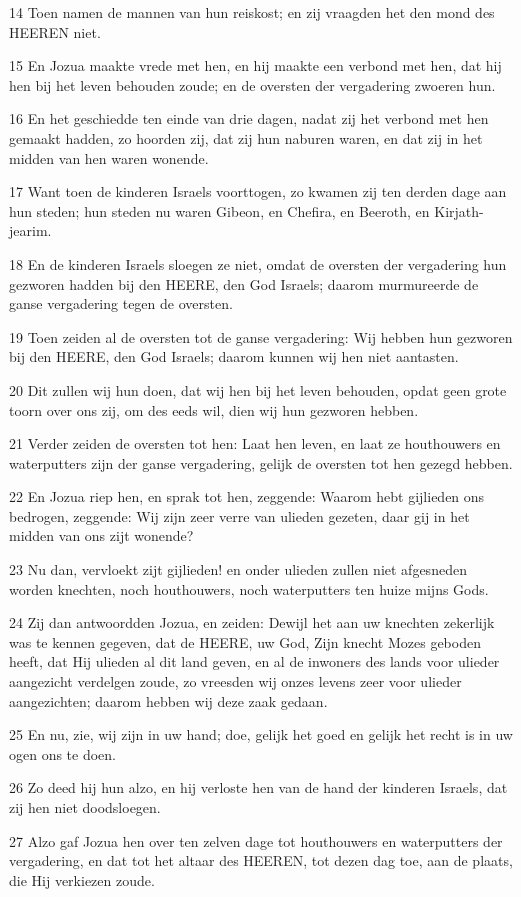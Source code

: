 \par 14 Toen namen de mannen van hun reiskost; en zij vraagden het den mond des HEEREN niet.
\par 15 En Jozua maakte vrede met hen, en hij maakte een verbond met hen, dat hij hen bij het leven behouden zoude; en de oversten der vergadering zwoeren hun.
\par 16 En het geschiedde ten einde van drie dagen, nadat zij het verbond met hen gemaakt hadden, zo hoorden zij, dat zij hun naburen waren, en dat zij in het midden van hen waren wonende.
\par 17 Want toen de kinderen Israels voorttogen, zo kwamen zij ten derden dage aan hun steden; hun steden nu waren Gibeon, en Chefira, en Beeroth, en Kirjath-jearim.
\par 18 En de kinderen Israels sloegen ze niet, omdat de oversten der vergadering hun gezworen hadden bij den HEERE, den God Israels; daarom murmureerde de ganse vergadering tegen de oversten.
\par 19 Toen zeiden al de oversten tot de ganse vergadering: Wij hebben hun gezworen bij den HEERE, den God Israels; daarom kunnen wij hen niet aantasten.
\par 20 Dit zullen wij hun doen, dat wij hen bij het leven behouden, opdat geen grote toorn over ons zij, om des eeds wil, dien wij hun gezworen hebben.
\par 21 Verder zeiden de oversten tot hen: Laat hen leven, en laat ze houthouwers en waterputters zijn der ganse vergadering, gelijk de oversten tot hen gezegd hebben.
\par 22 En Jozua riep hen, en sprak tot hen, zeggende: Waarom hebt gijlieden ons bedrogen, zeggende: Wij zijn zeer verre van ulieden gezeten, daar gij in het midden van ons zijt wonende?
\par 23 Nu dan, vervloekt zijt gijlieden! en onder ulieden zullen niet afgesneden worden knechten, noch houthouwers, noch waterputters ten huize mijns Gods.
\par 24 Zij dan antwoordden Jozua, en zeiden: Dewijl het aan uw knechten zekerlijk was te kennen gegeven, dat de HEERE, uw God, Zijn knecht Mozes geboden heeft, dat Hij ulieden al dit land geven, en al de inwoners des lands voor ulieder aangezicht verdelgen zoude, zo vreesden wij onzes levens zeer voor ulieder aangezichten; daarom hebben wij deze zaak gedaan.
\par 25 En nu, zie, wij zijn in uw hand; doe, gelijk het goed en gelijk het recht is in uw ogen ons te doen.
\par 26 Zo deed hij hun alzo, en hij verloste hen van de hand der kinderen Israels, dat zij hen niet doodsloegen.
\par 27 Alzo gaf Jozua hen over ten zelven dage tot houthouwers en waterputters der vergadering, en dat tot het altaar des HEEREN, tot dezen dag toe, aan de plaats, die Hij verkiezen zoude.

